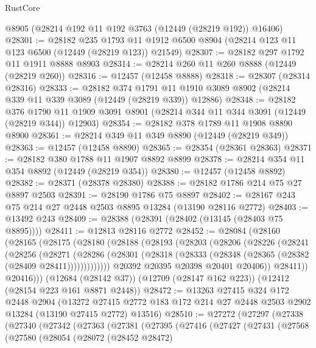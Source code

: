 \begin{lexlean}{RustCore}
\begin{coremodule}
    @8905
    (@28214 @192 @11 @192 @3763 (@12449 (@28219 @192)) @16406)
@28301 := @28182
    @235
    @1793
    @11
    @1912
    @6500
    @8904
    (@28214 @123 @11 @123 @6500 (@12449 (@28219 @123)) @21549)
@28307 := @28182 @297 @1792 @11 @1911 @8888 @8903
@28314 := @28214 @260 @11 @260 @8888 (@12449 (@28219 @260))
@28316 := @12457 (@12458 @8888)
@28318 := @28307 (@28314 @28316)
@28333 := @28182
    @374
    @1791
    @11
    @1910
    @3089
    @8902
    (@28214 @339 @11 @339 @3089 (@12449 (@28219 @339)) @12886)
@28348 := @28182
    @376
    @1790
    @11
    @1909
    @3091
    @8901
    (@28214 @344 @11 @344 @3091 (@12449 (@28219 @344)) @12903)
@28354 := @28182 @378 @1789 @11 @1908 @8890 @8900
@28361 := @28214 @349 @11 @349 @8890 (@12449 (@28219 @349))
@28363 := @12457 (@12458 @8890)
@28365 := @28354 (@28361 @28363)
@28371 := @28182 @380 @1788 @11 @1907 @8892 @8899
@28378 := @28214 @354 @11 @354 @8892 (@12449 (@28219 @354))
@28380 := @12457 (@12458 @8892)
@28382 := @28371 (@28378 @28380)
@28388 := @28182 @1786 @214 @75 @27 @8897 @2503
@28391 := @28190 @1786 @75 @8897
@28402 := @28167 @243 @75 @214 @27 @2448 @2503 @8895 @13284 (@13190 @28116 @2772)
@28403 := @13492 @243
@28409 := @28388 (@28391 (@28402 (@13145 (@28403 @75 @8895))))
@28411 := @12813 @28116 @2772
@28452 := @28084
    (@28160
      (@28165
        (@28175
          (@28180
            (@28188
              (@28193
                (@28203
                  (@28206
                    (@28226
                      (@28241
                        (@28256
                          (@28271
                            (@28286
                              (@28301
                                (@28318 (@28333 (@28348 (@28365 (@28382 (@28409 @28411)))))))))))))
                  @20392
                  @20395
                  @20398
                  @20401
                  @20406))
              @28411))
          @20416)))
    (@12684 (@28142 @37))
    (@12709 (@28147 @162 @223))
    (@12412 (@28154 @223 @161 @8871 @2448))
@28472 := @13263
    @27415
    @324
    @172
    @2448
    @2904
    (@13272 @27415 @2772 @183 @172 @214 @27 @2448 @2503 @2902 @13284 (@13190 @27415 @2772) @13516)
@28510 := @27272
    (@27297
      (@27338
        (@27340
          (@27342
            (@27363
              (@27381
                (@27395
                  (@27416
                    (@27427
                      (@27431
                        (@27568
                          (@27580
                            (@28054
                              (@28072
                                (@28452 @28472)

\end{coremodule}
\end{lexlean}
